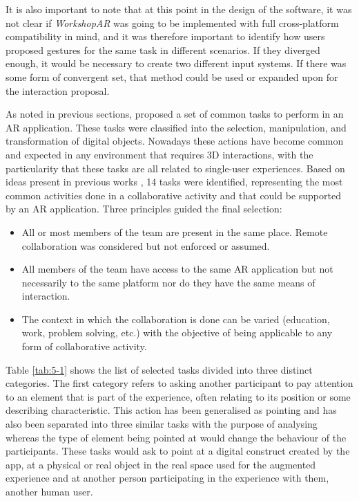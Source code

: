 It is also important to note that at this point in the design of the software, it was not clear if \emph{WorkshopAR} was going to be implemented with full cross-platform compatibility in
mind, and it was therefore important to identify how users proposed gestures for the same task in different scenarios. If they diverged enough, it would be necessary to create two different
input systems. If there was some form of convergent set, that method could be used or expanded upon for the interaction proposal.

As noted in previous sections, \textcite{piumsomboon_2013} proposed a set of common tasks to perform in an \ac{AR} application. These tasks were classified into the selection, manipulation,
and transformation of digital objects. Nowadays these actions have become common and expected in any environment that requires 3D interactions, with the particularity that these tasks are
all related to single-user experiences. Based on ideas present in previous works \parencite{pinelle_2003,scoular_2020}, 14 tasks were identified, representing the most common activities
done in a collaborative activity and that could be supported by an \ac{AR} application. Three principles guided the final selection:

\begin{itemize}
    \item All or most members of the team are present in the same place. Remote collaboration was considered but not enforced or assumed.
    \item All members of the team have access to the same \ac{AR} application but not necessarily to the same platform nor do they have the same means of interaction.
    \item The context in which the collaboration is done can be varied (education, work, problem solving, etc.) with the objective of being applicable to any form of collaborative activity.
\end{itemize}

Table \ref{tab:5-1} shows the list of selected tasks divided into three distinct categories. The first category refers to asking another participant to pay attention to an element that is
part of the experience, often relating to its position or some describing characteristic. This action has been generalised as pointing and has also been separated into three similar tasks
with the purpose of analysing whereas the type of element being pointed at would change the behaviour of the participants. These tasks would ask to point at a digital construct created by
the app, at a physical or real object in the real space used for the augmented experience and at another person participating in the experience with them, another human user.

